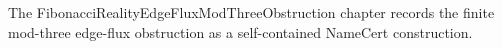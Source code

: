 The FibonacciRealityEdgeFluxModThreeObstruction chapter records the finite mod-three edge-flux obstruction as a self-contained NameCert construction.
